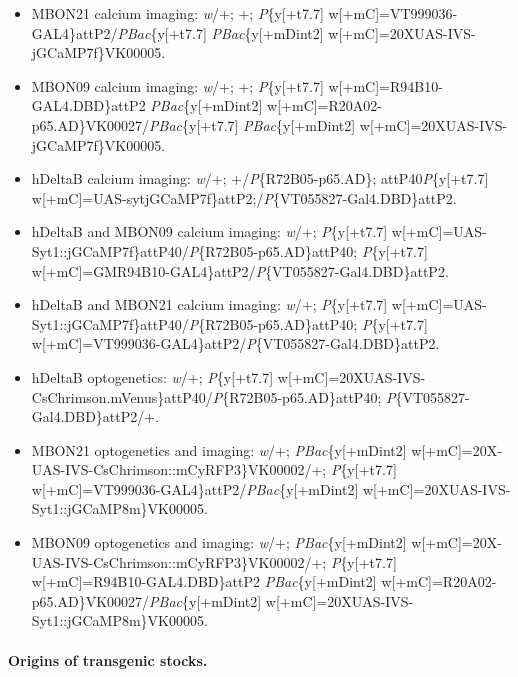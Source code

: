 {\raggedright
\begin{itemize}
    \item MBON21 calcium imaging: \textit{w}/+; +; \textit{P}\{y[+t7.7] w[+mC]=VT999036-GAL4\}attP2/\textit{PBac}\{y[+t7.7] \textit{PBac}\{y[+mDint2] w[+mC]=20XUAS-IVS-jGCaMP7f\}VK00005.
    \item MBON09 calcium imaging: \textit{w}/+; +; \textit{P}\{y[+t7.7] w[+mC]=R94B10-GAL4.DBD\}attP2 \textit{PBac}\{y[+mDint2] w[+mC]=R20A02-p65.AD\}VK00027/\textit{PBac}\{y[+t7.7] \textit{PBac}\{y[+mDint2] w[+mC]=20XUAS-IVS-jGCaMP7f\}VK00005.
    \item hDeltaB calcium imaging: \textit{w}/+; +/\textit{P}\{R72B05-p65.AD\}; attP40\textit{P}\{y[+t7.7] w[+mC]=UAS-sytjGCaMP7f\}attP2;/\textit{P}\{VT055827-Gal4.DBD\}attP2.
    \item hDeltaB and MBON09 calcium imaging: \textit{w}/+; \textit{P}\{y[+t7.7] w[+mC]=UAS-Syt1::jGCaMP7f\}attP40/\textit{P}\{R72B05-p65.AD\}attP40; \textit{P}\{y[+t7.7] w[+mC]=GMR94B10-GAL4\}attP2/\textit{P}\{VT055827-Gal4.DBD\}attP2.
    \item hDeltaB and MBON21 calcium imaging: \textit{w}/+; \textit{P}\{y[+t7.7] w[+mC]=UAS-Syt1::jGCaMP7f\}attP40/\textit{P}\{R72B05-p65.AD\}attP40; \textit{P}\{y[+t7.7] w[+mC]=VT999036-GAL4\}attP2/\textit{P}\{VT055827-Gal4.DBD\}attP2.
    \item hDeltaB optogenetics: \textit{w}/+; \textit{P}\{y[+t7.7] w[+mC]=20XUAS-IVS-CsChrimson.mVenus\}attP40/\textit{P}\{R72B05-p65.AD\}attP40; \textit{P}\{VT055827-Gal4.DBD\}attP2/+.
    \item MBON21 optogenetics and imaging: \textit{w}/+; \textit{PBac}\{y[+mDint2] w[+mC]=20X-UAS-IVS-CsChrimson::mCyRFP3\}VK00002/+; \textit{P}\{y[+t7.7] w[+mC]=VT999036-GAL4\}attP2/\textit{PBac}\{y[+mDint2] w[+mC]=20XUAS-IVS-Syt1::jGCaMP8m\}VK00005.
    \item MBON09 optogenetics and imaging: \textit{w}/+; \textit{PBac}\{y[+mDint2] w[+mC]=20X-UAS-IVS-CsChrimson::mCyRFP3\}VK00002/+; \textit{P}\{y[+t7.7] w[+mC]=R94B10-GAL4.DBD\}attP2 \textit{PBac}\{y[+mDint2] w[+mC]=R20A02-p65.AD\}VK00027/\textit{PBac}\{y[+mDint2] w[+mC]=20XUAS-IVS-Syt1::jGCaMP8m\}VK00005.
\end{itemize}
}

\paragraph{Origins of transgenic stocks.}

